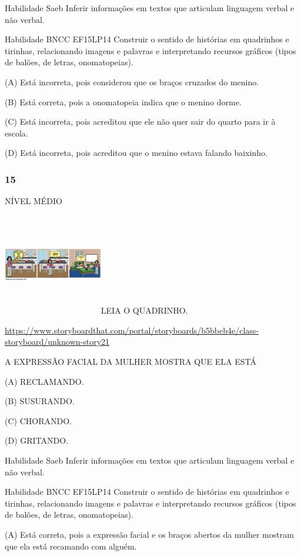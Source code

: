 \protect\hypertarget{_Hlk129336975}{}{}Habilidade Saeb Inferir
informações em textos que articulam linguagem verbal e não verbal.

Habilidade BNCC EF15LP14 Construir o sentido de histórias em quadrinhos
e tirinhas, relacionando imagens e palavras e interpretando recursos
gráficos (tipos de balões, de letras, onomatopeias).

(A) Está incorreta, pois considerou que os braços cruzados do menino.

(B) Está correta, pois a onomatopeia indica que o menino dorme.

(C) Está incorreta, pois acreditou que ele não quer sair do quarto para
ir à escola.

(D) Está incorreta, pois acreditou que o menino estava falando baixinho.

\subsubsection{15}\label{section-108}

NÍVEL MÉDIO

\includegraphics[width=1.70556in,height=1.74444in]{media/image146.png}LEIA
O QUADRINHO.

\url{https://www.storyboardthat.com/portal/storyboards/b5bbeb4e/class-storyboard/unknown-story21}

A EXPRESSÃO FACIAL DA MULHER MOSTRA QUE ELA ESTÁ

(A) RECLAMANDO.

(B) SUSURANDO.

(C) CHORANDO.

(D) GRITANDO.

Habilidade Saeb Inferir informações em textos que articulam linguagem
verbal e não verbal.

Habilidade BNCC EF15LP14 Construir o sentido de histórias em quadrinhos
e tirinhas, relacionando imagens e palavras e interpretando recursos
gráficos (tipos de balões, de letras, onomatopeias).

(A) Está correta, pois a expressão facial e os braços abertos da mulher
mostram que ela está recamando com alguém.

